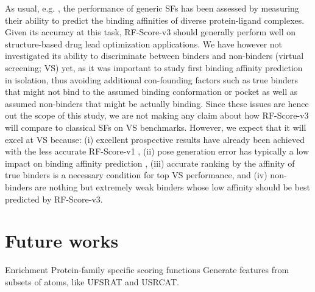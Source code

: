 As usual, e.g. \citep{1313}, the performance of generic SFs has been assessed by measuring their ability to predict the binding affinities of diverse protein-ligand complexes. Given its accuracy at this task, RF-Score-v3 should generally perform well on structure-based drug lead optimization applications. We have however not investigated its ability to discriminate between binders and non-binders (virtual screening; VS) yet, as it was important to study first binding affinity prediction in isolation, thus avoiding additional con-founding factors such as true binders that might not bind to the assumed binding conformation or pocket as well as assumed non-binders that might be actually binding. Since these issues are hence out the scope of this study, we are not making any claim about how RF-Score-v3 will compare to classical SFs on VS benchmarks. However, we expect that it will excel at VS because: (i) excellent prospective results have already been achieved with the less accurate RF-Score-v1 \citep{1281}, (ii) pose generation error has typically a low impact on binding affinity prediction \citep{1362}, (iii) accurate ranking by the affinity of true binders is a necessary condition for top VS performance, and (iv) non-binders are nothing but extremely weak binders whose low affinity should be best predicted by RF-Score-v3.

\section{Future works}

Enrichment
Protein-family specific scoring functions
Generate features from subsets of atoms, like UFSRAT and USRCAT.

\chapterend
